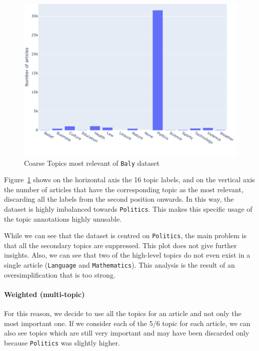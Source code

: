 \begin{figure}[!htbp]
    \centering
    \includegraphics[width=\linewidth]{figures/baly_coarse_first.pdf}
    \caption{Coarse Topics most relevant of \texttt{Baly} dataset}
    \label{fig:baly_coarse_first}
\end{figure}

Figure~\ref{fig:baly_coarse_first} shows on the horizontal axis the 16 topic labels, and on the vertical axis the number of articles that have the corresponding topic as the most relevant, discarding all the labels from the second position onwards.
In this way, the dataset is highly imbalanced towards \texttt{Politics}. This makes this specific usage of the topic annotations highly unusable.

While we can see that the dataset is centred on \texttt{Politics}, the main problem is that all the secondary topics are suppressed.
This plot does not give further insights.
Also, we can see that two of the high-level topics do not even exist in a single article (\texttt{Language} and \texttt{Mathematics}).
This analysis is the result of an oversimplification that is too strong.

\paragraph{Weighted (multi-topic)}

For this reason, we decide to use all the topics for an article and not only the most important one.
If we consider each of the 5/6 topic for each article, we can also see topics which are still very important and may have been discarded only because \texttt{Politics} was slightly higher.


